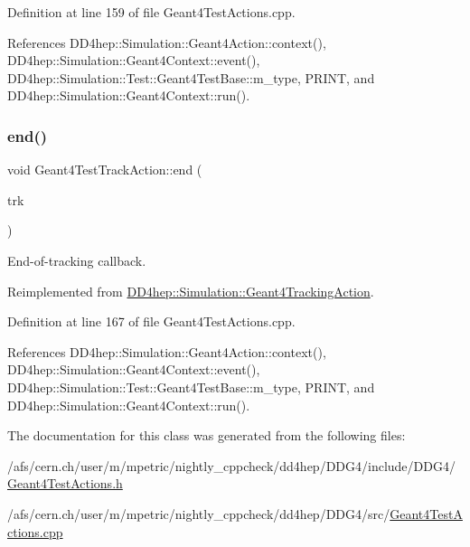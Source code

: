 Definition at line 159 of file Geant4\+Test\+Actions.\+cpp.



References D\+D4hep\+::\+Simulation\+::\+Geant4\+Action\+::context(), D\+D4hep\+::\+Simulation\+::\+Geant4\+Context\+::event(), D\+D4hep\+::\+Simulation\+::\+Test\+::\+Geant4\+Test\+Base\+::m\+\_\+type, P\+R\+I\+NT, and D\+D4hep\+::\+Simulation\+::\+Geant4\+Context\+::run().

\hypertarget{class_d_d4hep_1_1_simulation_1_1_test_1_1_geant4_test_track_action_a41bc0c1912089342579388ae2c176c69}{}\label{class_d_d4hep_1_1_simulation_1_1_test_1_1_geant4_test_track_action_a41bc0c1912089342579388ae2c176c69} 
\subsubsection{\texorpdfstring{end()}{end()}}
{\footnotesize\ttfamily void Geant4\+Test\+Track\+Action\+::end (\begin{DoxyParamCaption}\item[{const G4\+Track $\ast$}]{trk }\end{DoxyParamCaption})\hspace{0.3cm}{\ttfamily [virtual]}}



End-\/of-\/tracking callback. 



Reimplemented from \hyperlink{class_d_d4hep_1_1_simulation_1_1_geant4_tracking_action_a29f980c180576781771ea325b4a73f14}{D\+D4hep\+::\+Simulation\+::\+Geant4\+Tracking\+Action}.



Definition at line 167 of file Geant4\+Test\+Actions.\+cpp.



References D\+D4hep\+::\+Simulation\+::\+Geant4\+Action\+::context(), D\+D4hep\+::\+Simulation\+::\+Geant4\+Context\+::event(), D\+D4hep\+::\+Simulation\+::\+Test\+::\+Geant4\+Test\+Base\+::m\+\_\+type, P\+R\+I\+NT, and D\+D4hep\+::\+Simulation\+::\+Geant4\+Context\+::run().



The documentation for this class was generated from the following files\+:\begin{DoxyCompactItemize}
\item 
/afs/cern.\+ch/user/m/mpetric/nightly\+\_\+cppcheck/dd4hep/\+D\+D\+G4/include/\+D\+D\+G4/\hyperlink{_geant4_test_actions_8h}{Geant4\+Test\+Actions.\+h}\item 
/afs/cern.\+ch/user/m/mpetric/nightly\+\_\+cppcheck/dd4hep/\+D\+D\+G4/src/\hyperlink{_geant4_test_actions_8cpp}{Geant4\+Test\+Actions.\+cpp}\end{DoxyCompactItemize}

